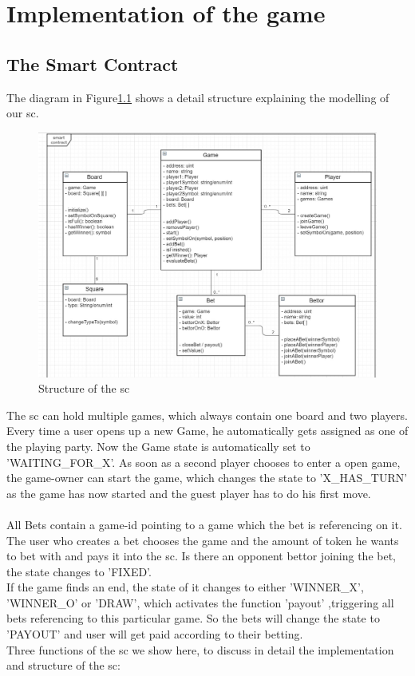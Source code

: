 \chapter{Implementation of the game}\label{ch:implementation}
\section{The Smart Contract}
\noindent The diagram in Figure\ref{fig:sc_uml}  shows a detail structure explaining the modelling of our \ac{sc}. \\
\begin{figure}[ht]
	\begin{center}
		\includegraphics[scale=0.22]{res/sc_uml}
	\end{center}
	\caption{Structure of the \ac{sc}}
	\label{fig:sc_uml}
\end{figure}\newline
\noindent The \ac{sc} can hold multiple games, which always contain one board and two players. Every time a user opens up a new Game, he automatically gets assigned as one of the playing party. Now the Game state is automatically set to 'WAITING\_FOR\_X'. As soon as a second player chooses to enter a open game, the game-owner can start the game, which changes the state to 'X\_HAS\_TURN' as the game has now started and the guest player has to do his first move.\\\\
All Bets contain a game-id pointing to a game which the bet is referencing on it. The user who creates a bet chooses the game and the amount of token he wants to bet with and pays it into the \ac{sc}. Is there an opponent bettor joining the bet, the state changes to 'FIXED'.\\
If the game finds an end, the state of it changes to either 'WINNER\_X', 'WINNER\_O' or 'DRAW', which activates the function 'payout' ,triggering all bets referencing to this particular game. So the bets will change the state to 'PAYOUT' and user will get paid according to their betting.\\ 
Three functions of the \ac{sc} we show here, to discuss in detail the implementation and structure of the \ac{sc}:\\





